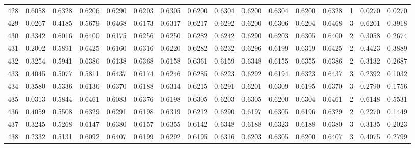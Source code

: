 \begin{tabular}{lrrrrrrrrrrrrrrr}
428 &      0.6058 &  0.6328 &  0.6206 &  0.6290 &  0.6203 &  0.6305 &  0.6200 &  0.6304 &  0.6200 &  0.6304 &   0.6200 &     0.6328 &      1 &                    0.0270 &                     0.0270 \\
429 &      0.0267 &  0.4185 &  0.5679 &  0.6468 &  0.6173 &  0.6317 &  0.6217 &  0.6292 &  0.6200 &  0.6306 &   0.6204 &     0.6468 &      3 &                    0.6201 &                     0.3918 \\
430 &      0.3342 &  0.6016 &  0.6400 &  0.6175 &  0.6256 &  0.6250 &  0.6282 &  0.6242 &  0.6290 &  0.6203 &   0.6305 &     0.6400 &      2 &                    0.3058 &                     0.2674 \\
431 &      0.2002 &  0.5891 &  0.6425 &  0.6160 &  0.6316 &  0.6220 &  0.6282 &  0.6232 &  0.6296 &  0.6199 &   0.6319 &     0.6425 &      2 &                    0.4423 &                     0.3889 \\
432 &      0.3254 &  0.5941 &  0.6386 &  0.6138 &  0.6368 &  0.6158 &  0.6361 &  0.6159 &  0.6348 &  0.6155 &   0.6355 &     0.6386 &      2 &                    0.3132 &                     0.2687 \\
433 &      0.4045 &  0.5077 &  0.5811 &  0.6437 &  0.6174 &  0.6246 &  0.6285 &  0.6223 &  0.6292 &  0.6194 &   0.6323 &     0.6437 &      3 &                    0.2392 &                     0.1032 \\
434 &      0.3580 &  0.5336 &  0.6136 &  0.6370 &  0.6188 &  0.6314 &  0.6215 &  0.6291 &  0.6201 &  0.6309 &   0.6195 &     0.6370 &      3 &                    0.2790 &                     0.1756 \\
435 &      0.0313 &  0.5844 &  0.6461 &  0.6083 &  0.6376 &  0.6198 &  0.6305 &  0.6203 &  0.6305 &  0.6200 &   0.6304 &     0.6461 &      2 &                    0.6148 &                     0.5531 \\
436 &      0.4059 &  0.5508 &  0.6329 &  0.6291 &  0.6198 &  0.6319 &  0.6212 &  0.6290 &  0.6197 &  0.6305 &   0.6196 &     0.6329 &      2 &                    0.2270 &                     0.1449 \\
437 &      0.3245 &  0.5268 &  0.6147 &  0.6380 &  0.6157 &  0.6355 &  0.6142 &  0.6348 &  0.6188 &  0.6323 &   0.6188 &     0.6380 &      3 &                    0.3135 &                     0.2023 \\
438 &      0.2332 &  0.5131 &  0.6092 &  0.6407 &  0.6199 &  0.6292 &  0.6195 &  0.6316 &  0.6203 &  0.6305 &   0.6200 &     0.6407 &      3 &                    0.4075 &                     0.2799 \\

\end{tabular}
